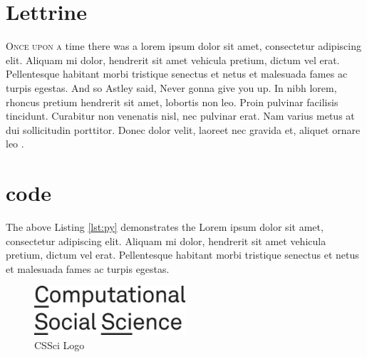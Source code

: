 \section{Lettrine}
\lettrine{O}{\fontsize{14}\fscshape{}\selectfont{}nce upon a} time there was a lorem ipsum dolor sit amet, consectetur adipiscing elit. Aliquam mi dolor, hendrerit sit amet vehicula pretium, dictum vel erat. Pellentesque habitant morbi tristique senectus et netus et malesuada fames ac turpis egestas. And so Astley \citeyear{astley1987never} said, Never gonna give you up. In nibh lorem, rhoncus pretium hendrerit sit amet, lobortis non leo. Proin pulvinar facilisis tincidunt. Curabitur non venenatis nisl, nec pulvinar erat. Nam varius metus at dui sollicitudin porttitor. Donec dolor velit, laoreet nec gravida et, aliquet ornare leo \cite{astley1987never}. 


\section{code}



The above Listing \ref{lst:py} demonstrates the Lorem ipsum dolor sit amet, consectetur adipiscing elit. Aliquam mi dolor, hendrerit sit amet vehicula pretium, dictum vel erat. Pellentesque habitant morbi tristique senectus et netus et malesuada fames ac turpis egestas.


\begin{figure}[h]
\centering
\includegraphics[width=0.5\textwidth]{images/csscilogo.png}
\caption{CSSci Logo}
\label{fig:logo-cssci}
\end{figure}